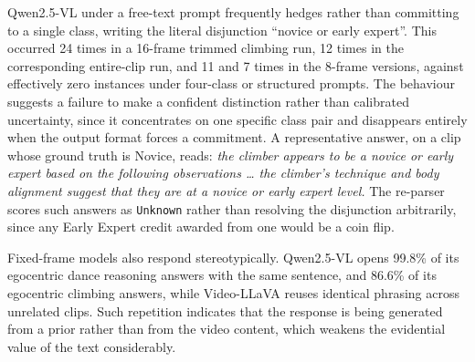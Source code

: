 \documentclass[logo,msc]{infthesis}
\begin{document}
Qwen2.5-VL under a free-text prompt frequently hedges rather than
committing to a single class, writing the literal disjunction ``novice or
early expert''. This occurred 24 times in a 16-frame trimmed climbing run,
12 times in the corresponding entire-clip run, and 11 and 7 times in the
8-frame versions, against effectively zero instances under four-class or
structured prompts. The behaviour suggests a failure to make a confident
distinction rather than calibrated uncertainty, since it concentrates on
one specific class pair and disappears entirely when the output format
forces a commitment. A representative answer, on a clip whose ground truth
is Novice, reads: \emph{the climber appears to be a novice or early expert
based on the following observations \ldots{} the climber's technique and
body alignment suggest that they are at a novice or early expert level.}
The re-parser scores such answers as \texttt{Unknown} rather than resolving
the disjunction arbitrarily, since any Early Expert credit awarded from one
would be a coin flip.

Fixed-frame models also respond stereotypically. Qwen2.5-VL opens 99.8\% of
its egocentric dance reasoning answers with the same sentence, and 86.6\%
of its egocentric climbing answers, while Video-LLaVA reuses identical
phrasing across unrelated clips. Such repetition indicates that the
response is being generated from a prior rather than from the video
content, which weakens the evidential value of the text considerably.
\end{document}
